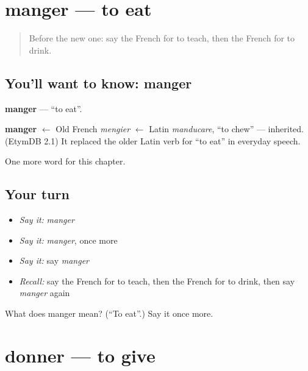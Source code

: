 \section[manger]{manger — to eat}

\label{lesson:FR-C61-manger}



\begin{quote}
Before the new one: say the French for to teach, then the French for to drink.
\end{quote}

\subsection*{You'll want to know: manger}
\textbf{manger} — \textquotedblleft{}to eat\textquotedblright{}.

\begin{cousinweb}
\textbf{manger} $\leftarrow$ Old French \emph{mengier} $\leftarrow$ Latin \emph{manducare}, \textquotedblleft{}to chew\textquotedblright{} — inherited. (EtymDB 2.1) It replaced the older Latin verb for \textquotedblleft{}to eat\textquotedblright{} in everyday speech.
\end{cousinweb}

\begin{grammarlens}[title={What you've built}]
One more word for this chapter.
\end{grammarlens}

\subsection*{Your turn}
\begin{itemize}
\raggedright
  \item \emph{Say it:} \emph{manger}
  \item \emph{Say it:} \emph{manger}, once more
  \item \emph{Say it:} say \emph{manger}
  \item \emph{Recall:} say the French for to teach, then the French for to drink, then say \emph{manger} again
\end{itemize}

\begin{tcolorbox}[breakable,colback=teal!4,colframe=teal!35!black,title={Before you move on}]
What does manger mean? (\textquotedblleft{}To eat\textquotedblright{}.) Say it once more.
\end{tcolorbox}
\section[donner]{donner — to give}

